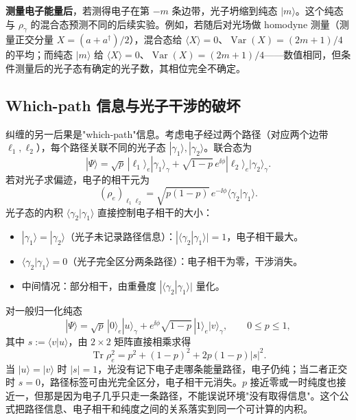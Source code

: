\textbf{测量电子能量后}，若测得电子在第 \(-m\) 条边带，光子坍缩到纯态 \(|m\rangle\)。这个纯态与 \(\rho_\gamma\) 的混合态预测不同的后续实验。例如，若随后对光场做 homodyne 测量（测量正交分量 \(X=(a+a^\dagger)/2\)），混合态给 \(\langle X\rangle=0\)、\(\operatorname{Var}(X)=(2m+1)/4\) 的平均；而纯态 \(|m\rangle\) 给 \(\langle X\rangle=0\)、\(\operatorname{Var}(X)=(2m+1)/4\)——数值相同，但条件测量后的光子态有确定的光子数，其相位完全不确定。

\subsection{Which-path 信息与光子干涉的破坏}

纠缠的另一后果是"which-path"信息。考虑电子经过两个路径（对应两个边带 \(\ell_1,\ell_2\)），每个路径关联不同的光子态 \(|\gamma_1\rangle,|\gamma_2\rangle\)。联合态为
\[
|\Psi\rangle=\sqrt{p}\,|\ell_1\rangle_e|\gamma_1\rangle_\gamma
+\sqrt{1-p}\,e^{\ii\phi}|\ell_2\rangle_e|\gamma_2\rangle_\gamma.
\]
若对光子求偏迹，电子的相干元为
\begin{equation}
(\rho_e)_{\ell_1\ell_2}=\sqrt{p(1-p)}\,e^{-\ii\phi}
\langle\gamma_2|\gamma_1\rangle.
\label{eq:feqo-which-path-coherence}
\end{equation}
光子态的内积 \(\langle\gamma_2|\gamma_1\rangle\) 直接控制电子相干的大小：
\begin{itemize}
\item \(|\gamma_1\rangle=|\gamma_2\rangle\)（光子未记录路径信息）：\(|\langle\gamma_2|\gamma_1\rangle|=1\)，电子相干最大。
\item \(\langle\gamma_2|\gamma_1\rangle=0\)（光子完全区分两条路径）：电子相干为零，干涉消失。
\item 中间情况：部分相干，由重叠度 \(|\langle\gamma_2|\gamma_1\rangle|\) 量化。
\end{itemize}

对一般归一化纯态
\[
|\Psi\rangle=\sqrt p\,|0\rangle_e|u\rangle_\gamma
+e^{\ii\phi}\sqrt{1-p}\,|1\rangle_e|v\rangle_\gamma,
\qquad 0\leq p\leq1,
\]
其中 \(s:=\langle v|u\rangle\)，由 \(2\times2\) 矩阵直接相乘求得
\begin{equation}
\operatorname{Tr}\rho_e^2=p^2+(1-p)^2+2p(1-p)|s|^2.
\label{eq:feqo-which-path-overlap}
\end{equation}
当 \(|u\rangle=|v\rangle\) 时 \(|s|=1\)，光没有记下电子走哪条能量路径，电子仍纯；当二者正交时 \(s=0\)，路径标签可由光完全区分，电子相干元消失。\(p\) 接近零或一时纯度也接近一，但那是因为电子几乎只走一条路径，不能误说环境"没有取得信息"。这个公式把路径信息、电子相干和纯度之间的关系落实到同一个可计算的内积。

